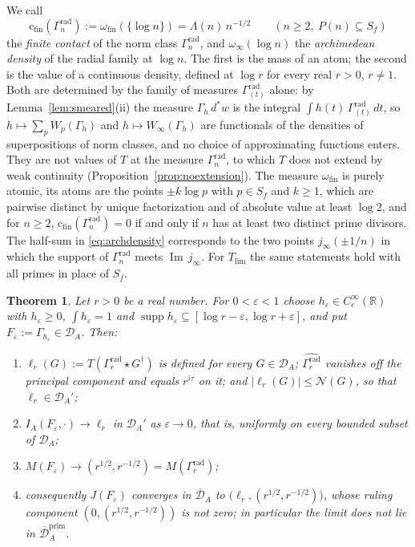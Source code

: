 \documentclass[11pt]{amsart}
\newtheorem{theorem}{Theorem}[section]
\theoremstyle{definition}
\newcommand{\R}{\mathbb R}
\newcommand{\Iml}{\operatorname{Im}}
\newcommand{\supp}{\operatorname{supp}}
\newcommand{\DA}{\mathcal D_A}
\newcommand{\Dbar}{\overline{\mathcal D}_A}
\newcommand{\cfin}{\mathrm{c}_{\mathrm{fin}}}
\begin{document}
We call
\[
  \cfin(\Gamma_n^{\mathrm{rad}}):=\omega_{\mathrm{fin}}(\{\log n\})
  =\Lambda(n)\,n^{-1/2}\qquad(n\ge2,\ P(n)\subseteq S_f)
\]
the \emph{finite contact} of the norm class $\Gamma_n^{\mathrm{rad}}$, and
$\omega_\infty(\log n)$ the \emph{archimedean density} of the radial family at
$\log n$. The first is the mass of an atom; the second is the value of a
continuous density, defined at $\log r$ for every real $r>0$, $r\ne1$. Both
are determined by the family of measures $\Gamma^{\mathrm{rad}}_{(t)}$ alone:
by Lemma~\ref{lem:smeared}(ii) the measure $\Gamma_h\,d^*w$ is the integral
$\int h(t)\,\Gamma^{\mathrm{rad}}_{(t)}\,dt$, so
$h\mapsto\sum_pW_p(\Gamma_h)$ and $h\mapsto W_\infty(\Gamma_h)$ are
functionals of the densities of superpositions of norm classes, and no
choice of approximating functions enters. They are not values of $T$ at the
measure $\Gamma_n^{\mathrm{rad}}$, to which $T$ does not extend by weak
continuity (Proposition~\ref{prop:noextension}). The
measure $\omega_{\mathrm{fin}}$ is purely atomic, its atoms are the points
$\pm k\log p$ with $p\in S_f$ and $k\ge1$, which are pairwise distinct by
unique factorization and of absolute value at least $\log2$, and
for $n\ge2$, $\cfin(\Gamma_n^{\mathrm{rad}})=0$ if and only if $n$ has at
least two distinct prime divisors. The half-sum in \eqref{eq:archdensity} corresponds
to the two points $j_\infty(\pm1/n)$ in which the support of
$\Gamma_n^{\mathrm{rad}}$ meets $\Iml\,j_\infty$. For $T_{\lim}$ the same
statements hold with all primes in place of $S_f$.

\begin{theorem}\label{thm:radincompletion}
Let $r>0$ be a real number. For $0<\varepsilon<1$ choose $h_\varepsilon\in C_c^\infty(\R)$
with $h_\varepsilon\ge0$, $\int h_\varepsilon=1$ and
$\supp h_\varepsilon\subseteq[\log r-\varepsilon,\log r+\varepsilon]$, and put
$F_\varepsilon:=\Gamma_{h_\varepsilon}\in\DA$. Then:
\begin{enumerate}
\item[(i)] $\ell_r(G):=T(\Gamma_r^{\mathrm{rad}}\star G^\dagger)$ is defined
for every $G\in\DA$; $\widehat{\Gamma_r^{\mathrm{rad}}}$ vanishes off the
principal component and equals $r^{i\tau}$ on it; and
$|\ell_r(G)|\le\mathcal N(G)$, so that $\ell_r\in\DA'$;
\item[(ii)] $I_A(F_\varepsilon,\cdot)\to\ell_r$ in $\DA'$ as
$\varepsilon\to0$, that is, uniformly on every bounded subset of $\DA$;
\item[(iii)] $M(F_\varepsilon)\to(r^{1/2},r^{-1/2})
=M(\Gamma_r^{\mathrm{rad}})$;
\item[(iv)] consequently $J(F_\varepsilon)$ converges in $\Dbar$ to
$\bigl(\ell_r,(r^{1/2},r^{-1/2})\bigr)$, whose ruling component
$(0,(r^{1/2},r^{-1/2}))$ is not zero; in particular the limit does not lie in
$\Dbar^{\mathrm{prim}}$.
\end{enumerate}
\end{theorem}
\end{document}
